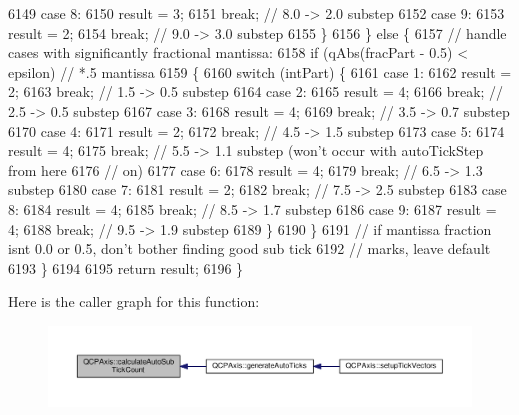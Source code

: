 \begin{DoxyCode}
6149     \textcolor{keywordflow}{case} 8:
6150       result = 3;
6151       \textcolor{keywordflow}{break}; \textcolor{comment}{// 8.0 -> 2.0 substep}
6152     \textcolor{keywordflow}{case} 9:
6153       result = 2;
6154       \textcolor{keywordflow}{break}; \textcolor{comment}{// 9.0 -> 3.0 substep}
6155     \}
6156   \} \textcolor{keywordflow}{else} \{
6157     \textcolor{comment}{// handle cases with significantly fractional mantissa:}
6158     \textcolor{keywordflow}{if} (qAbs(fracPart - 0.5) < epsilon) \textcolor{comment}{// *.5 mantissa}
6159     \{
6160       \textcolor{keywordflow}{switch} (intPart) \{
6161       \textcolor{keywordflow}{case} 1:
6162         result = 2;
6163         \textcolor{keywordflow}{break}; \textcolor{comment}{// 1.5 -> 0.5 substep}
6164       \textcolor{keywordflow}{case} 2:
6165         result = 4;
6166         \textcolor{keywordflow}{break}; \textcolor{comment}{// 2.5 -> 0.5 substep}
6167       \textcolor{keywordflow}{case} 3:
6168         result = 4;
6169         \textcolor{keywordflow}{break}; \textcolor{comment}{// 3.5 -> 0.7 substep}
6170       \textcolor{keywordflow}{case} 4:
6171         result = 2;
6172         \textcolor{keywordflow}{break}; \textcolor{comment}{// 4.5 -> 1.5 substep}
6173       \textcolor{keywordflow}{case} 5:
6174         result = 4;
6175         \textcolor{keywordflow}{break}; \textcolor{comment}{// 5.5 -> 1.1 substep (won't occur with autoTickStep from here}
6176                \textcolor{comment}{// on)}
6177       \textcolor{keywordflow}{case} 6:
6178         result = 4;
6179         \textcolor{keywordflow}{break}; \textcolor{comment}{// 6.5 -> 1.3 substep}
6180       \textcolor{keywordflow}{case} 7:
6181         result = 2;
6182         \textcolor{keywordflow}{break}; \textcolor{comment}{// 7.5 -> 2.5 substep}
6183       \textcolor{keywordflow}{case} 8:
6184         result = 4;
6185         \textcolor{keywordflow}{break}; \textcolor{comment}{// 8.5 -> 1.7 substep}
6186       \textcolor{keywordflow}{case} 9:
6187         result = 4;
6188         \textcolor{keywordflow}{break}; \textcolor{comment}{// 9.5 -> 1.9 substep}
6189       \}
6190     \}
6191     \textcolor{comment}{// if mantissa fraction isnt 0.0 or 0.5, don't bother finding good sub tick}
6192     \textcolor{comment}{// marks, leave default}
6193   \}
6194 
6195   \textcolor{keywordflow}{return} result;
6196 \}
\end{DoxyCode}


Here is the caller graph for this function\+:\nopagebreak
\begin{figure}[H]
\begin{center}
\leavevmode
\includegraphics[width=350pt]{class_q_c_p_axis_a3c5c045019fcdc0843a3e064eda7478a_icgraph}
\end{center}
\end{figure}


